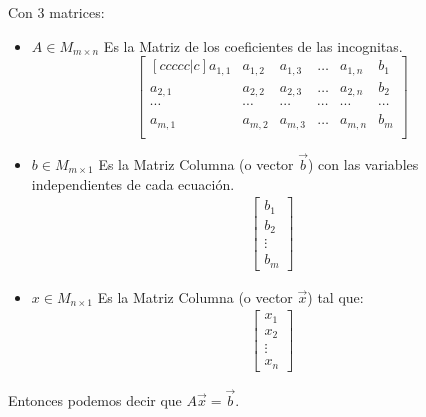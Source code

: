\documentclass[12pt, fleqn]{report}                             %
\theoremstyle{break}                                            %
\newcommand{\bVector}[1]                                        %
        { \ensuremath{\begin{bmatrix}#1\end{bmatrix}} }             %
\begin{document}
                Con 3 matrices:
                \begin{itemize}
                    \item
                        $A \in M_{m \times n}$ Es la Matriz de los coeficientes de las incognitas.
                        \begin{equation*}
                            \begin{bmatrix}[ccccc|c]
                                a_{1,1} & a_{1,2} & a_{1,3} & \dots  & a_{1,n} & b_1     \\
                                a_{2,1} & a_{2,2} & a_{2,3} & \dots  & a_{2,n} & b_2     \\
                                \cdots  & \cdots  & \cdots  & \cdots & \cdots  & \cdots  \\
                                a_{m,1} & a_{m,2} & a_{m,3} & \dots  & a_{m,n} & b_m     \\
                            \end{bmatrix}
                        \end{equation*}


                    \item 
                        $b \in M_{m \times 1}$ Es la Matriz Columna (o vector $\vec{b}$) con las variables 
                        independientes de cada ecuación.
                        \begin{align*}
                            \bVector{b_1 \\ b_2 \\ \vdots \\ b_m}
                        \end{align*}

                    \item 
                        $x \in M_{n \times 1}$ Es la Matriz Columna (o vector $\vec{x}$) tal que:
                        \begin{align*}
                            \bVector{x_1 \\ x_2 \\ \vdots \\ x_n}
                        \end{align*}

                \end{itemize}

                Entonces podemos decir que $A \vec x = \vec b$.




        \clearpage
\end{document}
